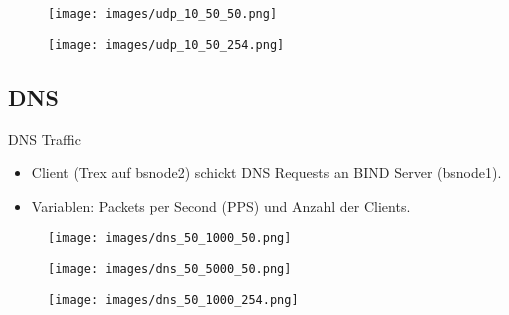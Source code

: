 \documentclass[11pt,german,table,dvipsnames]{beamer}
\begin{document}
\begin{frame}{}
    \begin{figure}
        \centering
        \texttt{[image: images/udp\_10\_50\_50.png]}
    \end{figure}
\end{frame}

\begin{frame}{}
    \begin{figure}
        \centering
        \texttt{[image: images/udp\_10\_50\_254.png]}
    \end{figure}
\end{frame}

\subsection{DNS}

\begin{frame}{DNS Traffic}
    \begin{itemize}
        \item Client (Trex auf bsnode2) schickt DNS Requests an BIND Server (bsnode1).
        \item Variablen: Packets per Second (PPS) und Anzahl der Clients.
    \end{itemize}
\end{frame}

\begin{frame}{}

\begin{figure}
    \centering
    \texttt{[image: images/dns\_50\_1000\_50.png]}
\end{figure}
    
\end{frame}
\begin{frame}

\begin{figure}
    \centering
    \texttt{[image: images/dns\_50\_5000\_50.png]}
\end{figure}
    
\end{frame}

\begin{frame}

\begin{figure}
    \centering
    \texttt{[image: images/dns\_50\_1000\_254.png]}
\end{figure}
    
\end{frame}
\end{document}

